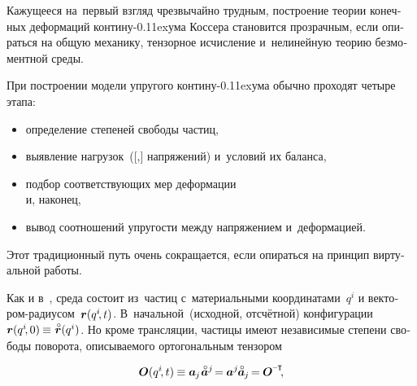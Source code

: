 \begin{otherlanguage}{russian}

Кажущееся на~первый взгляд чрезвычайно трудным, построение теории конечных деформаций контину\kern-0.11exума Коссера становится прозрачным, если опираться на общую механику, тензорное исчисление и~нелинейную теорию безмоментной среды.

При построении модели упругого контину\kern-0.11exума обычно проходят четыре этапа:
\begin{itemize}
\item определение степеней свободы частиц,
\item выявление нагрузок~([,] напряжений) и~условий их баланса,
\item подбор соответствующих мер деформации
\\
\hspace*{-\listlabelwithsep}и, наконец,
\item вывод соотношений упругости между напряжением и~деформацией.
\end{itemize}

\vspace{-0.16em}\noindent
Этот традиционный путь очень сокращается, если опираться на принцип виртуальной работы.

Как и в~, среда состоит из~частиц с~материальными координатами~$q^i$ и вектором\hbox{-}радиусом~${\bm{r}(q^i\hspace{-0.4ex}, t)}$.
В~начальной~(исходной, отсчётной) конфигурации ${\currentlocationvector(q^i\hspace{-0.4ex}, 0) \hspace{-0.12ex} \equiv \hspace{.12ex} \initiallocationvector(q^i)}$.
Но кроме трансляции, частицы имеют независимые степени свободы поворота, описываемого ортогональным тензором

\nopagebreak\vspace{-0.2em}\begin{equation*}
\rotationtensor(q^i\hspace{-0.4ex}, t) \hspace{-0.1ex}
\equiv
\bm{a}_{\hspace{-0.12ex}j} \hspace{.16ex} \mathcircabove{\bm{a}}^j \hspace{-0.32ex}
= \hspace{-0.1ex} \bm{a}^j \hspace{-0.12ex} \mathcircabove{\bm{a}}_{\hspace{-0.12ex}j} \hspace{-0.25ex}
= \hspace{-0.1ex} \rotationtensor^{\hspace{-0.1ex}\expminusT}
\hspace{-0.5ex} ,
\end{equation*}


\end{otherlanguage}
